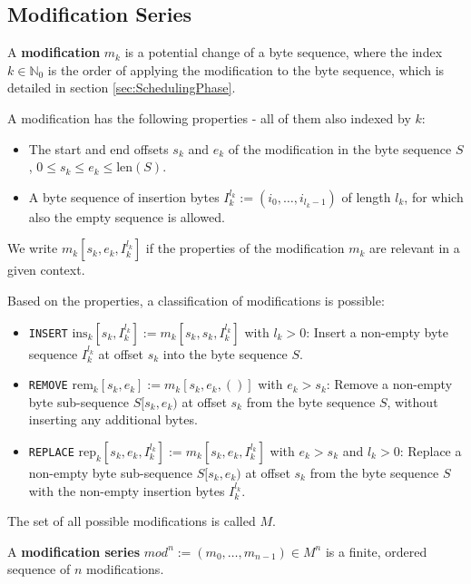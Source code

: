 \documentclass[english, 10pt, openright, twocolumn, landscape, twoside, notitlepage, a4paper, pdftex]		
{article}
\begin{document}
\subsection{Modification Series}%
\label{sec:ModificationSeries}%

A \textbf{modification} $m_{k}$ is a potential change of a byte sequence, where the index $k\in\mathbb{N}_{0}$ is the order of applying the modification to the byte sequence, which is detailed in section \ref{sec:SchedulingPhase}.

A modification has the following properties - all of them also indexed by $k$:
\begin{itemize}
\item The start and end offsets $s_{k}$ and $e_{k}$ of the modification in the byte sequence $S$, $0\leq s_{k}\leq e_{k}\leq \text{len}(S)$.
\item A byte sequence of insertion bytes $I_{k}^{l_{k}}:=(i_{0},\ldots,i_{l_{k}-1})$ of length $l_{k}$, for which also the empty sequence is allowed.
\end{itemize}

We write $m_{k}[s_{k}, e_{k}, I_{k}^{l_{k}}]$ if the properties of the modification $m_{k}$ are relevant in a given context.

Based on the properties, a classification of modifications is possible:
\begin{itemize}
\item \texttt{INSERT} $\text{ins}_{k}[s_{k},I_{k}^{l_{k}}]:=m_{k}[s_{k},s_{k},I_{k}^{l_{k}}]$ with $l_{k}>0$: Insert a non-empty byte sequence $I_{k}^{l_{k}}$ at offset $s_{k}$ into the byte sequence $S$.
\item \texttt{REMOVE} $\text{rem}_{k}[s_{k},e_{k}]:=m_{k}[s_{k},e_{k},()]$ with $e_{k}>s_{k}$: Remove a non-empty byte sub-sequence $S[s_{k},e_{k})$ at offset $s_{k}$ from the byte sequence $S$, without inserting any additional bytes.
\item \texttt{REPLACE} $\text{rep}_{k}[s_{k},e_{k},I_{k}^{l_{k}}]:=m_{k}[s_{k},e_{k},I_{k}^{l_{k}}]$ with $e_{k}>s_{k}$ and $l_{k}>0$: Replace a non-empty byte sub-sequence $S[s_{k},e_{k})$ at offset $s_{k}$ from the byte sequence $S$ with the non-empty insertion bytes $I_{k}^{l_{k}}$.
\end{itemize}

The set of all possible modifications is called $M$.

A \textbf{modification series} $mod^{n} :=(m_{0},\ldots,m_{n-1})\in M^{n}$ is a finite, ordered sequence of $n$ modifications.
\end{document}

